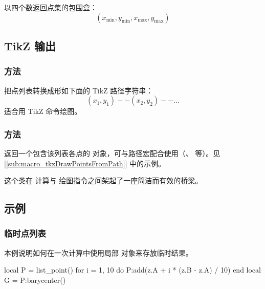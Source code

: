 以四个数返回点集的包围盒：
\[
  (x_{\min}, y_{\min}, x_{\max}, y_{\max})
\]


\subsection{TikZ 输出}
\label{subsec:list_point_output}

\subsubsection{方法 }
\label{ssub:meth_list_point_to_path}

把点列表转换成形如下面的 TikZ 路径字符串：
\[
  (x_1,y_1) -- (x_2,y_2) -- \dots
\]
适合用 TikZ 命令绘图。

\subsubsection{方法 }
\label{ssub:meth_list_point_as_path}

返回一个包含该列表各点的  对象，可与路径宏配合使用（、 等）。见 [\ref{sub:macro_tkzDrawPointsFromPath}] 中的示例。


\medskip

这个类在  计算与  绘图指令之间架起了一座简洁而有效的桥梁。


\subsection{示例}
\label{subsec:list_point_examples}

\subsubsection{临时点列表}
\label{ssub:list_point_example_local}

本例说明如何在一次计算中使用局部  对象来存放临时结果。

\begin{tkzexample}
local P = list_point()
for i = 1, 10 do
  P:add(z.A + i * (z.B - z.A) / 10)
end
local G = P:barycenter()
\end{tkzexample}

